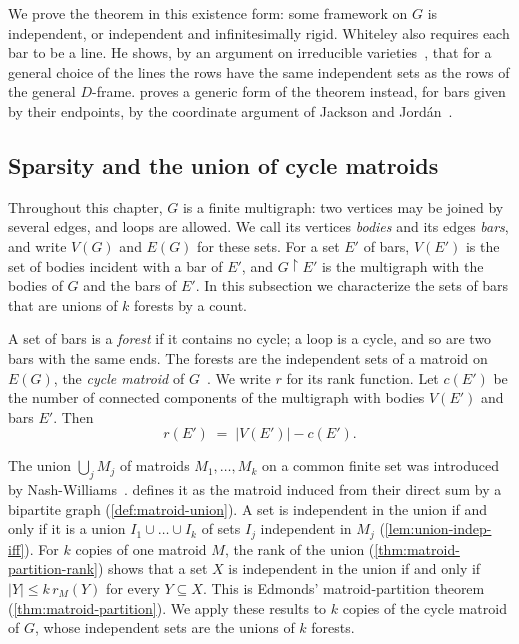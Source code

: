 We prove the theorem in this existence form: some framework on $G$ is
independent, or independent and infinitesimally rigid. Whiteley also
requires each bar to be a line. He shows, by an argument on irreducible
varieties~\cite[\S3.1]{whiteley1988}, that for a general choice of the
lines the rows have the same independent sets as the rows of the
general $D$-frame.  proves a generic form of
the theorem instead, for bars given by their endpoints, by the
coordinate argument of Jackson and Jord\'an~\cite{jacksonJordan2009}.

\subsection{Sparsity and the union of cycle matroids}
\label{sec:body-bar-matroid-union}

Throughout this chapter, $G$ is a finite multigraph: two vertices may
be joined by several edges, and loops are allowed. We call its vertices
\emph{bodies} and its edges \emph{bars}, and write $V(G)$ and $E(G)$
for these sets. For a set $E'$ of bars, $V(E')$ is the set of bodies
incident with a bar of $E'$, and $G \restriction E'$ is the multigraph
with the bodies of $G$ and the bars of $E'$. In this subsection we
characterize the sets of bars that are unions of $k$ forests by a
count.

A set of bars is a \emph{forest} if it contains no cycle; a loop is a
cycle, and so are two bars with the same ends. The forests are the
independent sets of a matroid on $E(G)$, the \emph{cycle matroid} of
$G$~\cite[\S1.1]{oxley2011}. We write $r$ for its rank function. Let
$c(E')$ be the number of connected components of the multigraph with
bodies $V(E')$ and bars $E'$. Then~\cite[(1.3.8)]{oxley2011}
\[
  r(E') \;=\; |V(E')| - c(E').
\]

The union $\bigcup_j M_j$ of matroids $M_1, \dots, M_k$ on a common
finite set was introduced by Nash-Williams~\cite{nashWilliams1966}.
 defines it as the matroid induced from their
direct sum by a bipartite graph (\cref{def:matroid-union}). A set is
independent in the union if and only if it is a union
$I_1 \cup \dots \cup I_k$ of sets $I_j$ independent in $M_j$
(\cref{lem:union-indep-iff}). For $k$ copies of one matroid $M$, the
rank of the union (\cref{thm:matroid-partition-rank}) shows that a set
$X$ is independent in the union if and only if $|Y| \le k\, r_M(Y)$
for every $Y \subseteq X$. This is Edmonds' matroid-partition
theorem~\cite[Theorem~1]{edmonds1965} (\cref{thm:matroid-partition}).
We apply these results to $k$ copies of the cycle matroid of $G$, whose
independent sets are the unions of $k$ forests.

